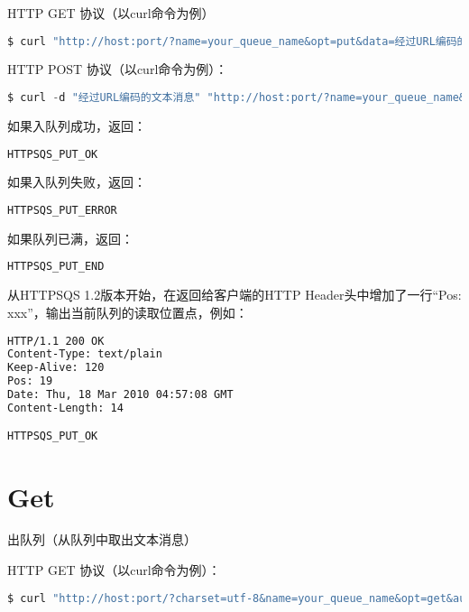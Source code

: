 HTTP GET 协议（以curl命令为例）

\begin{lstlisting}[language=bash]
$ curl "http://host:port/?name=your_queue_name&opt=put&data=经过URL编码的文本消息&auth=mypass123"
\end{lstlisting}


HTTP POST 协议（以curl命令为例）：

\begin{lstlisting}[language=Python]
$ curl -d "经过URL编码的文本消息" "http://host:port/?name=your_queue_name&opt=put&auth=mypass123"
\end{lstlisting}


如果入队列成功，返回：


\begin{lstlisting}[language=bash]
HTTPSQS_PUT_OK
\end{lstlisting}

如果入队列失败，返回：


\begin{lstlisting}[language=bash]
HTTPSQS_PUT_ERROR
\end{lstlisting}

如果队列已满，返回：



\begin{lstlisting}[language=bash]
HTTPSQS_PUT_END
\end{lstlisting}

从HTTPSQS 1.2版本开始，在返回给客户端的HTTP Header头中增加了一行“Pos: xxx”，输出当前队列的读取位置点，例如：


\begin{lstlisting}[language=bash]
HTTP/1.1 200 OK
Content-Type: text/plain
Keep-Alive: 120
Pos: 19
Date: Thu, 18 Mar 2010 04:57:08 GMT
Content-Length: 14

HTTPSQS_PUT_OK
\end{lstlisting}


\section{Get}


出队列（从队列中取出文本消息）

HTTP GET 协议（以curl命令为例）：

\begin{lstlisting}[language=bash]
$ curl "http://host:port/?charset=utf-8&name=your_queue_name&opt=get&auth=mypass123"
\end{lstlisting}




